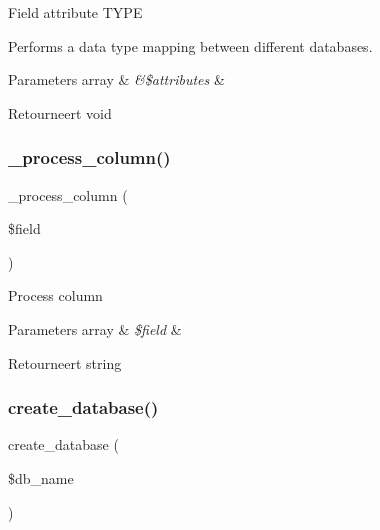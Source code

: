 Field attribute T\+Y\+PE

Performs a data type mapping between different databases.


\begin{DoxyParams}[1]{Parameters}
array & {\em \&\$attributes} & \\
\hline
\end{DoxyParams}
\begin{DoxyReturn}{Retourneert}
void 
\end{DoxyReturn}
\mbox{\label{class_c_i___d_b__pdo__firebird__forge_a8f38f1c5b5dddecca4befbe393f3f299}} 
\subsubsection{\texorpdfstring{\_process\_column()}{\_process\_column()}}
{\footnotesize\ttfamily \+\_\+process\+\_\+column (\begin{DoxyParamCaption}\item[{}]{\$field }\end{DoxyParamCaption})\hspace{0.3cm}{\ttfamily [protected]}}

Process column


\begin{DoxyParams}[1]{Parameters}
array & {\em \$field} & \\
\hline
\end{DoxyParams}
\begin{DoxyReturn}{Retourneert}
string 
\end{DoxyReturn}
\mbox{\label{class_c_i___d_b__pdo__firebird__forge_a902a7267babceb2ce595706f217e00ad}} 
\subsubsection{\texorpdfstring{create\_database()}{create\_database()}}
{\footnotesize\ttfamily create\+\_\+database (\begin{DoxyParamCaption}\item[{}]{\$db\+\_\+name }\end{DoxyParamCaption})}

